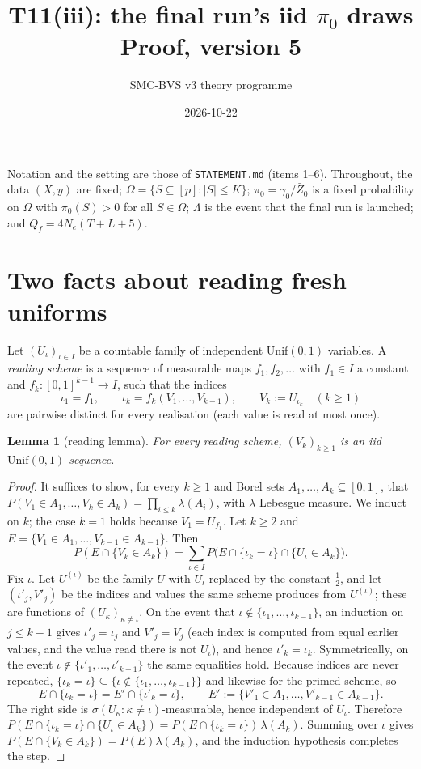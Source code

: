 \documentclass[11pt]{article}
\title{T11(iii): the final run's iid $\pi_0$ draws\\ \large Proof, version 5}
\author{SMC-BVS v3 theory programme}
\date{2026-10-22}
\newtheorem{lemma}[theorem]{Lemma}
\theoremstyle{remark}
\newcommand{\Unif}{\mathrm{Unif}(0,1)}
\newcommand{\1}{\mathbf{1}}
\begin{document}
\maketitle

\noindent Notation and the setting are those of \texttt{STATEMENT.md} (items 1--6). Throughout, the data $(X,y)$ are fixed;
$\Omega=\{S\subseteq[p]:|S|\le K\}$; $\pi_0=\gamma_0/\bar Z_0$ is a fixed probability on $\Omega$ with
$\pi_0(S)>0$ for all $S\in\Omega$; $\Lambda$ is the event that the final run is launched; and
$Q_f=4N_e(T+L+5)$.

\section{Two facts about reading fresh uniforms}

Let $(U_\iota)_{\iota\in I}$ be a countable family of independent $\Unif$ variables. A \emph{reading scheme} is a
sequence of measurable maps $f_1,f_2,\dots$ with $f_1\in I$ a constant and $f_k:[0,1]^{k-1}\to I$, such that the
indices
\[
\iota_1=f_1,\qquad \iota_k=f_k(V_1,\dots,V_{k-1}),\qquad V_k:=U_{\iota_k}\quad(k\ge1)
\]
are pairwise distinct for every realisation (each value is read at most once).

\begin{lemma}[reading lemma]\label{lem:read}
For every reading scheme, $(V_k)_{k\ge1}$ is an iid $\Unif$ sequence.
\end{lemma}

\begin{proof}
It suffices to show, for every $k\ge1$ and Borel sets $A_1,\dots,A_k\subseteq[0,1]$, that
$P(V_1\in A_1,\dots,V_k\in A_k)=\prod_{i\le k}\lambda(A_i)$, with $\lambda$ Lebesgue measure. We induct on $k$; the
case $k=1$ holds because $V_1=U_{f_1}$. Let $k\ge2$ and $E=\{V_1\in A_1,\dots,V_{k-1}\in A_{k-1}\}$. Then
\[
P(E\cap\{V_k\in A_k\})=\sum_{\iota\in I}P\big(E\cap\{\iota_k=\iota\}\cap\{U_\iota\in A_k\}\big).
\]
Fix $\iota$. Let $U^{(\iota)}$ be the family $U$ with $U_\iota$ replaced by the constant $\tfrac12$, and let
$(\iota'_j,V'_j)$ be the indices and values the same scheme produces from $U^{(\iota)}$; these are functions of
$(U_\kappa)_{\kappa\ne\iota}$. On the event that $\iota\notin\{\iota_1,\dots,\iota_{k-1}\}$, an induction on
$j\le k-1$ gives $\iota'_j=\iota_j$ and $V'_j=V_j$ (each index is computed from equal earlier values, and the value read
there is not $U_\iota$), and hence $\iota'_k=\iota_k$. Symmetrically, on the event
$\iota\notin\{\iota'_1,\dots,\iota'_{k-1}\}$ the same equalities hold. Because indices are never repeated,
$\{\iota_k=\iota\}\subseteq\{\iota\notin\{\iota_1,\dots,\iota_{k-1}\}\}$ and likewise for the primed scheme, so
\[
E\cap\{\iota_k=\iota\}=E'\cap\{\iota'_k=\iota\},\qquad E':=\{V'_1\in A_1,\dots,V'_{k-1}\in A_{k-1}\}.
\]
The right side is $\sigma(U_\kappa:\kappa\ne\iota)$-measurable, hence independent of $U_\iota$. Therefore
$P(E\cap\{\iota_k=\iota\}\cap\{U_\iota\in A_k\})=P(E\cap\{\iota_k=\iota\})\,\lambda(A_k)$. Summing over $\iota$
gives $P(E\cap\{V_k\in A_k\})=P(E)\lambda(A_k)$, and the induction hypothesis completes the step.
\end{proof}
\end{document}
